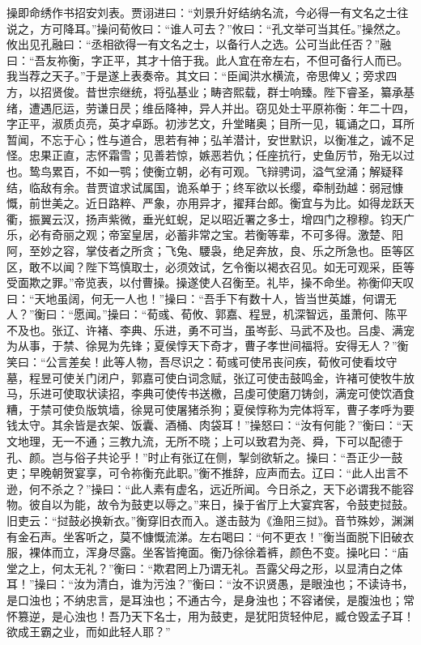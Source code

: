 操即命绣作书招安刘表。贾诩进曰：“刘景升好结纳名流，今必得一有文名之士往说之，方可降耳。”操问荀攸曰：“谁人可去？”攸曰：“孔文举可当其任。”操然之。攸出见孔融曰：“丞相欲得一有文名之士，以备行人之选。公可当此任否？”融曰：“吾友祢衡，字正平，其才十倍于我。此人宜在帝左右，不但可备行人而已。我当荐之天子。”于是遂上表奏帝。其文曰：“臣闻洪水横流，帝思俾乂；旁求四方，以招贤俊。昔世宗继统，将弘基业；畴咨熙载，群士响臻。陛下睿圣，纂承基绪，遭遇厄运，劳谦日昃；维岳降神，异人并出。窃见处士平原祢衡：年二十四，字正平，淑质贞亮，英才卓跞。初涉艺文，升堂睹奥；目所一见，辄诵之口，耳所暂闻，不忘于心；性与道合，思若有神；弘羊潜计，安世默识，以衡准之，诚不足怪。忠果正直，志怀霜雪；见善若惊，嫉恶若仇；任座抗行，史鱼厉节，殆无以过也。鸷鸟累百，不如一鹗；使衡立朝，必有可观。飞辩骋词，溢气坌涌；解疑释结，临敌有余。昔贾谊求试属国，诡系单于；终军欲以长缨，牵制劲越：弱冠慷慨，前世美之。近日路粹、严象，亦用异才，擢拜台郎。衡宜与为比。如得龙跃天衢，振翼云汉，扬声紫微，垂光虹蜺，足以昭近署之多士，增四门之穆穆。钧天广乐，必有奇丽之观；帝室皇居，必蓄非常之宝。若衡等辈，不可多得。激楚、阳阿，至妙之容，掌伎者之所贪；飞兔、騕袅，绝足奔放，良、乐之所急也。臣等区区，敢不以闻？陛下笃慎取士，必须效试，乞令衡以褐衣召见。如无可观采，臣等受面欺之罪。”帝览表，以付曹操。操遂使人召衡至。礼毕，操不命坐。祢衡仰天叹曰：“天地虽阔，何无一人也！”操曰：“吾手下有数十人，皆当世英雄，何谓无人？”衡曰：“愿闻。”操曰：“荀彧、荀攸、郭嘉、程昱，机深智远，虽萧何、陈平不及也。张辽、许褚、李典、乐进，勇不可当，虽岑彭、马武不及也。吕虔、满宠为从事，于禁、徐晃为先锋；夏侯惇天下奇才，曹子孝世间福将。安得无人？”衡笑曰：“公言差矣！此等人物，吾尽识之：荀彧可使吊丧问疾，荀攸可使看坟守墓，程昱可使关门闭户，郭嘉可使白词念赋，张辽可使击鼓鸣金，许褚可使牧牛放马，乐进可使取状读招，李典可使传书送檄，吕虔可使磨刀铸剑，满宠可使饮酒食糟，于禁可使负版筑墙，徐晃可使屠猪杀狗；夏侯惇称为完体将军，曹子孝呼为要钱太守。其余皆是衣架、饭囊、酒桶、肉袋耳！”操怒曰：“汝有何能？”衡曰：“天文地理，无一不通；三教九流，无所不晓；上可以致君为尧、舜，下可以配德于孔、颜。岂与俗子共论乎！”时止有张辽在侧，掣剑欲斩之。操曰：“吾正少一鼓吏；早晚朝贺宴享，可令祢衡充此职。”衡不推辞，应声而去。辽曰：“此人出言不逊，何不杀之？”操曰：“此人素有虚名，远近所闻。今日杀之，天下必谓我不能容物。彼自以为能，故令为鼓吏以辱之。”来日，操于省厅上大宴宾客，令鼓吏挝鼓。旧吏云：“挝鼓必换新衣。”衡穿旧衣而入。遂击鼓为《渔阳三挝》。音节殊妙，渊渊有金石声。坐客听之，莫不慷慨流涕。左右喝曰：“何不更衣！”衡当面脱下旧破衣服，裸体而立，浑身尽露。坐客皆掩面。衡乃徐徐着裤，颜色不变。操叱曰：“庙堂之上，何太无礼？”衡曰：“欺君罔上乃谓无礼。吾露父母之形，以显清白之体耳！”操曰：“汝为清白，谁为污浊？”衡曰：“汝不识贤愚，是眼浊也；不读诗书，是口浊也；不纳忠言，是耳浊也；不通古今，是身浊也；不容诸侯，是腹浊也；常怀篡逆，是心浊也！吾乃天下名士，用为鼓吏，是犹阳货轻仲尼，臧仓毁孟子耳！欲成王霸之业，而如此轻人耶？”

